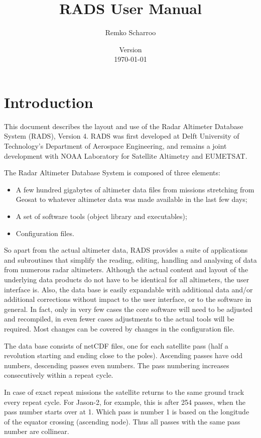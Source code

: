 \documentclass[a4paper,11pt,openany,natbib,nomargin]{thesis}
\title{RADS User Manual}
\author{Remko Scharroo}
\date{Version \vernum\\\today}
\begin{document}
\maketitle
\tableofcontents

\chapter{Introduction}

\label{ch:intro}

This document describes the layout and use of the Radar Altimeter Database System (RADS), Version 4. RADS was first developed at Delft University of Technology's Department of Aerospace Engineering, and remains a joint development with NOAA Laboratory for Satellite Altimetry and EUMETSAT.

The Radar Altimeter Database System is composed of three elements:
\begin{itemize}
\item A few hundred gigabytes of altimeter data files from missions stretching from Geosat to whatever altimeter data was made available in the last few days;
\item A set of software tools (object library and executables);
\item Configuration files.
\end{itemize}

So apart from the actual altimeter data, RADS provides a suite of applications and subroutines that simplify the reading, editing, handling and analysing of data from numerous radar altimeters. Although the actual content and layout of the underlying data products do not have to be identical for all altimeters, the user interface is. Also, the data base is easily expandable with additional data and/or additional corrections without impact to the user interface, or to the software in general. In fact, only in very few cases the core software will need to be adjusted and recompiled, in even fewer cases adjustments to the actual tools will be required. Most changes can be covered by changes in the configuration file.

The data base consists of netCDF files, one for each satellite pass (half a revolution starting and ending close to the poles). Ascending passes have odd numbers, descending passes even numbers. The pass numbering increases consecutively within a repeat cycle. 

In case of exact repeat missions the satellite returns to the same ground track every repeat cycle. For Jason-2, for example, this is after 254 passes, when the pass number starts over at 1. Which pass is number 1 is based on the longitude of the equator crossing (ascending node). Thus all passes with the same pass number are collinear.
\end{document}

